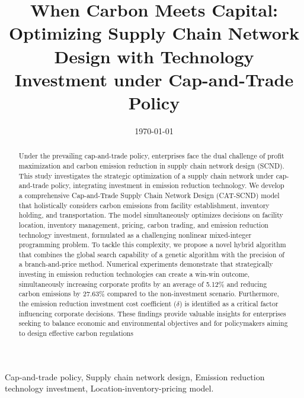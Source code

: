 \documentclass[]{article}
\theoremstyle{plain}%
\theoremstyle{definition}
\theoremstyle{remark}
\theoremstyle{plain}%
\begin{document}
\title{\bf When Carbon Meets Capital: Optimizing Supply Chain Network Design with Technology Investment under Cap-and-Trade Policy}
\author[]{}




\date{\today}
    
\maketitle
    
\begin{abstract}
Under the prevailing cap-and-trade policy, enterprises face the dual challenge of profit maximization and carbon emission reduction in supply chain network design (SCND). This study investigates the strategic optimization of a supply chain network under cap-and-trade policy, integrating investment in emission reduction technology. We develop a comprehensive Cap-and-Trade Supply Chain Network Design (CAT-SCND) model that holistically considers carbon emissions from facility establishment, inventory holding, and transportation. The model simultaneously optimizes decisions on facility location, inventory management, pricing, carbon trading, and emission reduction technology investment, formulated as a challenging nonlinear mixed-integer programming problem. To tackle this complexity, we propose a novel hybrid algorithm that combines the global search capability of a genetic algorithm with the precision of a branch-and-price method. Numerical experiments demonstrate that strategically investing in emission reduction technologies can create a win-win outcome, simultaneously increasing corporate profits by an average of 5.12\% and reducing carbon emissions by 27.63\% compared to the non-investment scenario. Furthermore, the emission reduction investment cost coefficient ($\delta$) is identified as a critical factor influencing corporate decisions. These findings provide valuable insights for enterprises seeking to balance economic and environmental objectives and for policymakers aiming to design effective carbon regulations
\end{abstract}
    
     Cap-and-trade policy, Supply chain network design, Emission reduction technology investment, Location-inventory-pricing model.
    
\end{document}
